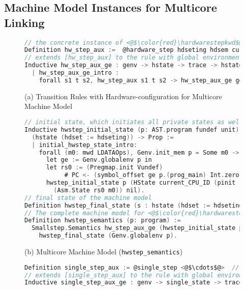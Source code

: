 
\subsection{Machine Model Instances for Multicore Linking}
\label{chapter:certikos:subsec:intermediate-machine-instantiation}



\begin{figure}
\begin{lstlisting}[language=C]
// the concrete instance of <@$\color{red}\hardwarestepkwd$@>
Definition hw_step_aux :=  @hardware_step hdseting hdsem current_CPU_ID.
// extends [hw_step_aux] to the rule with global environment  
Inductive hw_step_aux_ge : genv -> hstate -> trace -> hstate -> Prop :=
  | hw_step_aux_ge_intro : 
    forall s1 t s2, hw_step_aux s1 t s2 -> hw_step_aux_ge ge s1 t s2.
\end{lstlisting}
\begin{center}
(a) Transition Rules with Hardware-configuration for Multicore Machine Model
\end{center}
\begin{lstlisting}[language=C, deletekeywords={int}]    
// initial state, which initiates all private states as well as a global log
Inductive hwstep_initial_state (p: AST.program fundef unit): 
  (hstate (hdset := hdseting)) -> Prop := 
  | initial_hwstep_state_intro: 
    forall (m0: mwd LDATAOps), Genv.init_mem p = Some m0 ->
      let ge := Genv.globalenv p in
      let rs0 := (Pregmap.init Vundef) 
           # PC <- (symbol_offset ge p.(prog_main) Int.zero) # ESP <- Vzero in
      hwstep_initial_state p (HState current_CPU_ID (pinit (B := core_set)
        (Asm.State rs0 m0)) nil).
// final state of the machine model 
Definition hwstep_final_state (s : hstate (hdset := hdseting)) (i : int) := False.
// The complete machine model for <@$\color{red}\hardwarestepkwd$@> with proper initial and final states  
Definition hwstep_semantics (p: program) :=
  Smallstep.Semantics hw_step_aux_ge (hwstep_initial_state p) 
    hwstep_final_state (Genv.globalenv p).
\end{lstlisting}
\begin{center}
(b) Multicore Machine Model (\lstinline$hwstep_semantics$)
\end{center}
\begin{lstlisting}[language=C]
Definition single_step_aux := @single_step <@$\cdots$@>  // the concrete instance of <@$\color{red}\singlestepkwd$@>
// extends [single_step_aux] to the rule with global environment  
Inductive single_step_aux_ge : genv -> single_state -> trace -> 

\end{lstlisting}
\end{figure}
